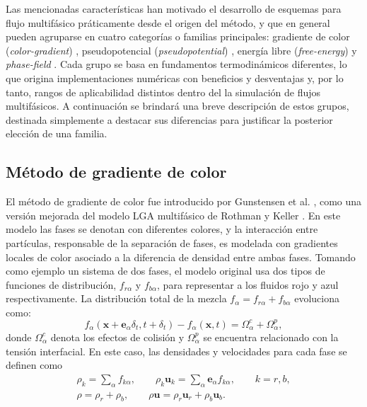 Las mencionadas caracter\'isticas han motivado el desarrollo de esquemas para flujo multif\'asico pr\'aticamente desde el origen del m\'etodo, y que en general pueden agruparse en cuatro categor\'ias o familias principales: gradiente de color (\emph{color-gradient}) \cite{liu_three-dimensional_2012,gunstensen_lattice_1991}, pseudopotencial (\emph{pseudopotential}) \cite{shan_lattice_1993,shan_simulation_1994,chen_critical_2014}, energ\'ia libre (\emph{free-energy}) \cite{swift_lattice_1996,inamuro_galilean_2000} y \emph{phase-field} \cite{he_lattice_1999,liang_phase-field-based_2014}. Cada grupo se basa en fundamentos termodin\'amicos diferentes, lo que origina implementaciones num\'ericas con beneficios y desventajas y, por lo tanto, rangos de aplicabilidad distintos dentro del la simulaci\'on de flujos multif\'asicos. A continuaci\'on se brindar\'a una breve descripci\'on de estos grupos, destinada simplemente a destacar sus diferencias para justificar la posterior elecci\'on de una familia.
\newpage

\subsection*{M\'etodo de gradiente de color}
El m\'etodo de gradiente de color fue introducido por Gunstensen et al. \cite{gunstensen_lattice_1991}, como una versi\'on mejorada del modelo LGA multif\'asico de Rothman y Keller \cite{rothman_immiscible_1988}. En este modelo las fases se denotan con diferentes colores, y la interacci\'on entre part\'iculas, responsable de la separaci\'on de fases, es modelada con gradientes locales de color asociado a la diferencia de densidad entre ambas fases. Tomando como ejemplo un sistema de dos fases, el modelo original usa dos tipos de funciones de distribuci\'on, $f_{r{\alpha}}$ y $f_{b{\alpha}}$, para representar a los fluidos rojo y azul respectivamente. La distribuci\'on total de la mezcla $f_{\alpha} = f_{r{\alpha}}+f_{b{\alpha}}$ evoluciona como:
\begin{equation}
	f_{\alpha}(\bm{x}+\bm{e}_{\alpha} \delta_t,t+\delta_t) - f_{\alpha}(\bm{x},t) = \Omega_{\alpha}^c + \Omega_{\alpha}^p,
\end{equation}
donde $\Omega_{\alpha}^c$ denota los efectos de colisi\'on y $\Omega_{\alpha}^p$ se encuentra relacionado con la tensi\'on interfacial. En este caso, las densidades y velocidades para cada fase se definen como
\begin{equation}
	\begin{gathered}
	\rho_k = \sum_{\alpha} f_{k{\alpha}}, \qquad \rho_k\bm{u}_k = \sum_{\alpha} \bm{e}_{\alpha} f_{k{\alpha}}, \qquad k=r,b, \\
	\rho = \rho_r + \rho_b, \qquad \rho\bm{u} = \rho_r\bm{u}_r + \rho_b\bm{u}_b.
	\end{gathered}
\end{equation}

